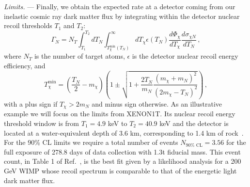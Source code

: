 \documentclass[prl,twocolumn,groupedaddress,nofootinbib, superscriptaddress]{revtex4-1}
\begin{document}
{\it Limits.} --- Finally, we obtain the expected rate at a detector coming from our inelastic cosmic ray dark matter flux by integrating within the detector nuclear recoil thresholds $T_1$ and $T_2$:
%
\begin{equation}
\Gamma_N = N_T \int_{T_1}^{T_2} dT_N \int_{T_\chi^\text{min}(T_N)}^\infty dT_\chi \epsilon(T_N) \frac{d\Phi_\chi}{dT_\chi} \frac{d\sigma_{\chi N}}{dT_N} \, ,
\end{equation}
%
where $N_T$ is the number of target atoms, $\epsilon$ is the detector nuclear recoil energy efficiency, and
%
\begin{equation}
T_\chi^\text{min} = \left(\frac{T_N}{2} - m_\chi \right)\left(1 \pm \sqrt{1 + \frac{2T_N}{m_N}\frac{(m_\chi + m_N)^2}{(2m_\chi - T_N)^2}} \right) \, ,
\end{equation}
%
with a plus sign if $T_\chi > 2m_N$ and minus sign otherwise. As an illustrative example we will focus on the limits from XENON1T. Its nuclear recoil energy threshold window is from $T_1 = 4.9$ keV to $T_2 = 40.9$ keV and the detector is located at a water-equivalent depth of 3.6 km, corresponding to 1.4 km of rock~\cite{Aprile:2018dbl}. For the 90\% CL limits we require a total number of events $N_{90\% \text{ CL}} = 3.56$ for the full exposure of 278.8 days of data collection with 1.3t fiducial mass. This event count, in Table 1 of Ref.~\cite{Aprile:2018dbl}, is the best fit given by a likelihood analysis for a 200 GeV WIMP whose recoil spectrum is comparable to that of the energetic light dark matter flux. 
\end{document}
